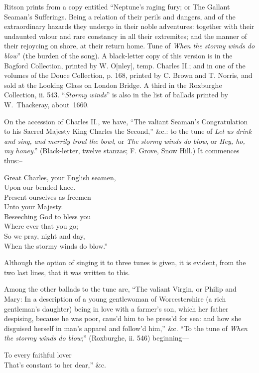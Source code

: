 Ritson prints from a copy entitled “Neptune’s raging fury; or The Gallant
Seaman’s Sufferings. Being a relation of their perils and dangers, and of the
extraordinary hazards they undergo in their noble adventures: together with
their undaunted valour and rare constancy in all their extremites; and the
manner of their rejoycing on shore, at their return home. Tune of \textit{When the
stormy winds do blow}” (the burden of the song). A black-letter copy of this
version is in the Bagford Collection, printed by W. O[nley], temp. Charles II.;
and in one of the volumes of the Douce Collection, p. 168, printed by C. Brown
and T. Norris, and sold at the Looking Glass on London Bridge. A third in the
Roxburghe Collection, ii. 543. “\textit{Stormy winds}” is also in the list of ballads
printed by W.~Thackeray, about~1660.

On the accession of Charles II., we have, “The valiant Seaman’s Congratulation
to his Sacred Majesty King Charles the Second,” \&c.: to the tune of
\textit{Let us drink and sing, and merrily troul the bowl}, or \textit{The stormy winds do blow}, or
\textit{Hey, ho, my honey}.” (Black-letter, twelve stanzas; F. Grove, Snow Hill.)
It commences thus:--
\settowidth{\versewidth}{Great Charles, your English seamen,}
\begin{scverse}
\begin{altverse}
Great Charles, your English seamen,\\
Upon our bended knee.\\
Present ourselves as freemen\\
Unto your Majesty.\\
Beseeching God to bless you\\
Where ever that you go;\\
So we pray, night and day,\\
When the stormy winds do blow.”
\end{altverse}
\end{scverse}

Although the option of singing it to three tunes is given, it is evident, from the
two last lines, that it was written to this.

Among the other ballads to the tune are, “The valiant Virgin, or Philip and
Mary: In a description of a young gentlewoman of Worcestershire (a rich gentleman’s 
daughter) being in love with a farmer’s son, which her father despising,
because he was poor, caus’d him to be press’d for sea: and how she disguised
herself in man’s apparel and follow’d him,” \&c. “To the tune of \textit{When the stormy
winds do blow};” (Roxburghe, ii. 546) beginning—
\begin{scverse}
To every faithful lover\\
\vin That’s constant to her dear,” \&c.
\end{scverse}

